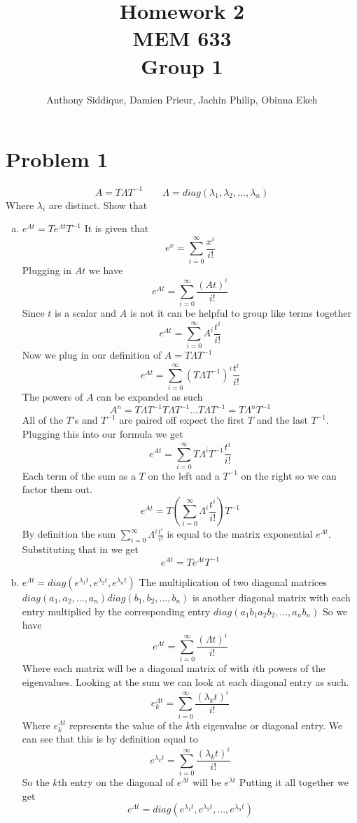 \documentclass{article}
\author{Anthony Siddique, Damien Prieur, Jachin Philip, Obinna Ekeh}
\title{Homework 2\\ MEM 633 \\ Group 1}
\date{}
\begin{document}
\maketitle

\section*{Problem 1}
$$ A = T \Lambda T^{-1} \qquad \Lambda = diag(\lambda_1,\lambda_2, ..., \lambda_n) $$
Where $\lambda_i$ are distinct.
Show that
\begin{enumerate}[(a)]
\item $e^{At} = Te^{\Lambda t}T^{-1}$
\newline
It is given that
$$ e^x = \sum_{i=0}^\infty \frac{x^i}{i!} $$
Plugging in $At$ we have
$$ e^{At} = \sum_{i=0}^\infty \frac{(At)^i}{i!} $$
Since $t$ is a scalar and $A$ is not it can be helpful to group like terms together
$$ e^{At} = \sum_{i=0}^\infty A^i\frac{t^i}{i!} $$
Now we plug in our definition of $A = T \Lambda T^{-1} $
$$ e^{At} = \sum_{i=0}^\infty (T \Lambda T^{-1})^i\frac{t^i}{i!} $$
The powers of $A$ can be expanded as such
$$ A^n = T\Lambda T^{-1} T\Lambda T^{-1}...T\Lambda T^{-1} = T\Lambda^n T^{-1} $$
All of the $T$'s and $T^{-1}$ are paired off expect the first $T$ and the last $T^{-1}$.
Plugging this into our formula we get
$$ e^{At} = \sum_{i=0}^\infty T \Lambda^i T^{-1}\frac{t^i}{i!} $$
Each term of the sum as a $T$ on the left and a $T^{-1}$ on the right so we can factor them out.
$$ e^{At} = T(\sum_{i=0}^\infty \Lambda^i \frac{t^i}{i!})T^{-1} $$
By definition the sum $\sum_{i=0}^\infty \Lambda^i \frac{t^i}{i!}$ is equal to the matrix exponential $e^{\Lambda t}$.
Substituting that in we get
$$ e^{At} = Te^{\Lambda t}T^{-1} $$



\item $e^{\Lambda t} = diag (e^{\lambda_1 t}, e^{\lambda_2 t}, e^{\lambda_n t})$
\newline
The multiplication of two diagonal matrices  $diag(a_1, a_2, ..., a_n) diag(b_1, b_2, ..., b_n)$ is another diagonal matrix with each entry multiplied by the corresponding entry $ diag(a_1b_1 a_2b_2, ..., a_nb_n)$
So we have
$$ e^{\Lambda t} = \sum_{i=0}^\infty \frac{(\Lambda t) ^i}{i!} $$
Where each matrix will be a diagonal matrix of with $i$th powers of the eigenvalues.
Looking at the sum we can look at each diagonal entry as such.
$$ e^{\Lambda t}_k = \sum_{i=0}^\infty \frac{(\lambda_k t) ^i}{i!} $$
Where $e^{\Lambda t}_k$ represents the value of the $k$th eigenvalue or diagonal entry.
We can see that this is by definition equal to
$$ e^{\lambda_k t} = \sum_{i=0}^\infty \frac{(\lambda_k t) ^i}{i!} $$
So the $k$th entry on the diagonal of $e^{\Lambda t}$ will be $e^{\lambda t}$
Putting it all together we get
$$ e^{\Lambda t} = diag(e^{\lambda_1 t}, e^{\lambda_2 t}, ... , e^{\lambda_n t})$$

\end{enumerate}
\end{document}
